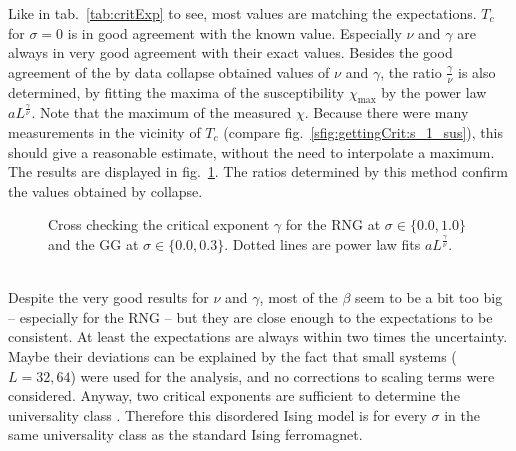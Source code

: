     Like in tab.\ \ref{tab:critExp} to see, most values
    are matching the expectations. \(T_c\) for \(\sigma = 0\) is in good
    agreement with the known value. Especially \(\nu\) and \(\gamma\)
    are always in very good agreement with their exact values. Besides the
    good agreement of the by data collapse obtained values of \(\nu\) and \(\gamma\),
    the ratio \(\frac{\gamma}{\nu}\) is also determined, by fitting the maxima of
    the susceptibility \(\chi_{\mathrm{max}}\) by the power law \(aL^\frac{\gamma}{\nu}\).
    Note that the maximum of the measured \(\chi\). Because there were
    many measurements in the vicinity of \(T_c\) (compare fig.\ \ref{sfig:gettingCrit:s_1_sus}),
    this should give a reasonable estimate, without the need to
    interpolate a maximum.
    The results are displayed in fig.\ \ref{fig:susCrossCheck}. The ratios
    determined by this method confirm the values obtained by collapse.
    \begin{figure}[htbp]
        \centering
        \caption[Alternative Way Determining $\gamma$]
        {
            Cross checking the critical exponent $\gamma$ for
                 the RNG at $\sigma \in \{0.0, 1.0\}$ and
                 the GG at $\sigma \in \{0.0, 0.3\}$.
            Dotted lines are power law fits \(aL^\frac{\gamma}{\nu}\).
        }
        \label{fig:susCrossCheck}
    \end{figure}\\
    Despite the very good results for \(\nu\) and \(\gamma\), most of the
    \(\beta\) seem to be a bit too big -- especially for the RNG -- but
    they are close enough to the expectations to be consistent. At least
    the expectations are always within two times the uncertainty.
    Maybe their deviations can be explained by the fact that small
    systems (\(L=32,64\)) were used for the analysis, and no corrections
    to scaling terms were considered.
    Anyway, two critical exponents are sufficient to determine the
    universality class \cite[p. 145]{Katzgraber2011}. Therefore this
    disordered Ising model is for every \(\sigma\) in the same universality
    class as the standard Ising ferromagnet.

